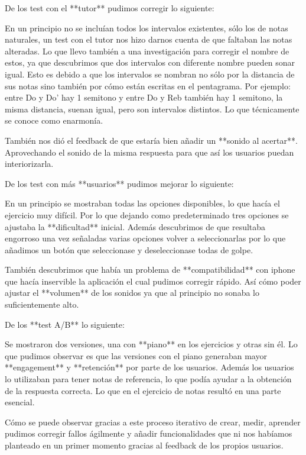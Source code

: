 \documentclass[12pt,twoside,titlepage]{report}
\begin{document}
De los test con el **tutor** pudimos corregir lo siguiente:

En un principio no se incluían todos los intervalos existentes, sólo los de notas naturales, un test con el tutor nos hizo darnos cuenta de que faltaban las notas alteradas. Lo que llevo también a una investigación para corregir el nombre de estos, ya que descubrimos que dos intervalos con diferente nombre pueden sonar igual. Esto es debido a que los intervalos se nombran no sólo por la distancia de sus notas sino también por cómo están escritas en el pentagrama. Por ejemplo: entre Do y Do' hay 1 semitono y entre Do y Reb también hay 1 semitono, la misma distancia, suenan igual, pero son intervalos distintos. Lo que técnicamente se conoce como enarmonía.

También nos dió el feedback de que estaría bien añadir un **sonido al acertar**. Aprovechando el sonido de la misma respuesta para que así los usuarios puedan interiorizarla.

De los test con más **usuarios** pudimos mejorar lo siguiente:

En un principio se mostraban todas las opciones disponibles, lo que hacía el ejercicio muy difícil. Por lo que dejando como predeterminado tres opciones se ajustaba la **dificultad** inicial. Además descubrimos de que resultaba engorroso una vez señaladas varias opciones volver a seleccionarlas por lo que añadimos un botón que seleccionase y deseleccionase todas de golpe.

También descubrimos que había un problema de **compatibilidad** con iphone que hacía inservible la aplicación el cual pudimos corregir rápido. Así cómo poder ajustar el **volumen** de los sonidos ya que al principio no sonaba lo suficientemente alto.

De los **test A/B** lo siguiente:

Se mostraron dos versiones, una con **piano** en los ejercicios y otras sin él. Lo que pudimos observar es que las versiones con el piano generaban mayor **engagement** y **retención** por parte de los usuarios. Además los usuarios lo utilizaban para tener notas de referencia, lo que podía ayudar a la obtención de la respuesta correcta. Lo que en el ejercicio de notas resultó en una parte esencial.

Cómo se puede observar gracias a este proceso iterativo de crear, medir, aprender pudimos corregir fallos ágilmente y añadir funcionalidades que ni nos habíamos planteado en un primer momento gracias al feedback de los propios usuarios.
\end{document}
